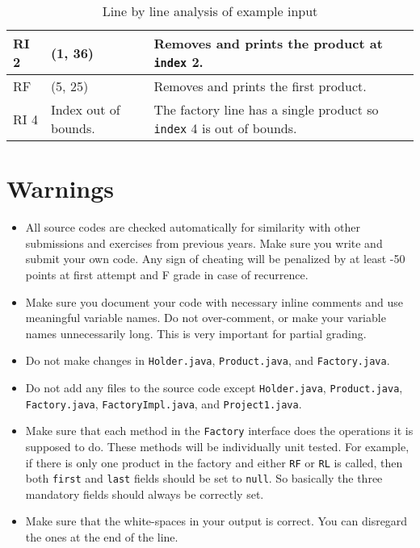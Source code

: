 \documentclass[10pt]{article}
\begin{document}
\begin{table}[H]
\begin{tabular}{||p{1.6cm}|p{4cm}|p{8.5cm}||}
        RI 2 & (1, 36) & Removes and prints the product at \texttt{index} 2. \\
        \hline
        
        RF & (5, 25) & Removes and prints the first product. \\
        \hline
        
        RI 4 & Index out of bounds. & The factory line has a single product so \texttt{index} 4 is out of bounds. \\
        \hline
        
        \hline
    \end{tabular}
    \caption{Line by line analysis of example input}
    \label{tab:my_label}
\end{table}



\section{Warnings}

\begin{itemize}

\item All source codes are checked automatically for similarity with other submissions and exercises from previous years. Make sure you write and submit your own code. Any sign of cheating will be penalized by at least -50 points at first attempt and F grade in case of recurrence.

\item Make sure you document your code with necessary inline comments and use meaningful variable names. Do not over-comment, or make your variable names unnecessarily long. This is very important for partial grading.

\item Do not make changes in \texttt{Holder.java}, \texttt{Product.java}, and \texttt{Factory.java}.

\item Do not add any files to the source code except \texttt{Holder.java}, \texttt{Product.java}, \texttt{Factory.java}, \texttt{FactoryImpl.java}, and \texttt{Project1.java}. 

\item Make sure that each method in the \texttt{Factory} interface does the operations it is supposed to do. These methods will be individually unit tested. For example, if there is only one product in the factory and either \verb|RF| or \verb|RL| is called, then both \texttt{first} and \texttt{last} fields should be set to \texttt{null}. So basically the three mandatory fields should always be correctly set.

\item Make sure that the white-spaces in your output is correct. You can disregard the ones at the end of the line.


\end{itemize}
\end{document}

